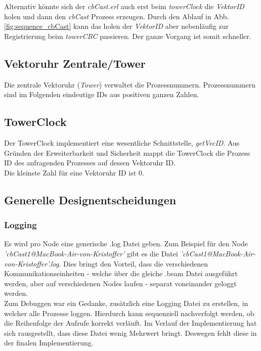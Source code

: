 Alternativ könnte sich der \textit{cbCast.erl} auch erst beim \textit{towerClock} die \textit{VektorID} holen und dann den \textit{cbCast} Prozess erzeugen. Durch den Ablauf in Abb. \ref{fig:sequence_cbCast} kann das holen der \textit{VektorID} aber nebenläufig zur Registrierung beim \textit{towerCBC} passieren. Der ganze Vorgang ist somit schneller.


\subsection{Vektoruhr Zentrale/Tower} \label{tower}

Die zentrale Vektoruhr (\textit{Tower}) verwaltet die Prozessnummern. Prozessnummern sind im Folgenden eindeutige IDs aus positiven ganzen Zahlen.

\subsection{TowerClock}

Der TowerClock implementiert eine wesentliche Schnittstelle, \textit{getVecID}. Aus Gründen der Erweiterbarkeit und Sicherheit mappt die TowerClock die Prozess ID des anfragenden Prozesses auf dessen Vektoruhr ID.
\\Die kleinste Zahl für eine Vektoruhr ID ist 0.

\subsection{Generelle Designentscheidungen}

\subsubsection{Logging}

Es wird pro Node eine generische .log Datei geben. Zum Beispiel für den Node \textit{'cbCast1@MacBook-Air-von-Kristoffer'} gibt es die Datei \textit{'cbCast1@MacBook-Air-von-Kristoffer'.log}. Dies bringt den Vorteil, dass die verschiedenen Kommunikationseinheiten - welche über die gleiche .beam Datei ausgeführt werden, aber auf verschiedenen Nodes laufen - separat voneinander geloggt werden.
\\Zum Debuggen war ein Gedanke, zusätzlich eine Logging Datei zu erstellen, in welcher alle Prozesse loggen. Hierdurch kann sequenziell nachverfolgt werden, ob die Reihenfolge der Aufrufe korrekt verläuft. Im Verlauf der Implementierung hat sich rausgestellt, dass diese Datei wenig Mehrwert bringt. Deswegen fehlt diese in der finalen Implementierung.